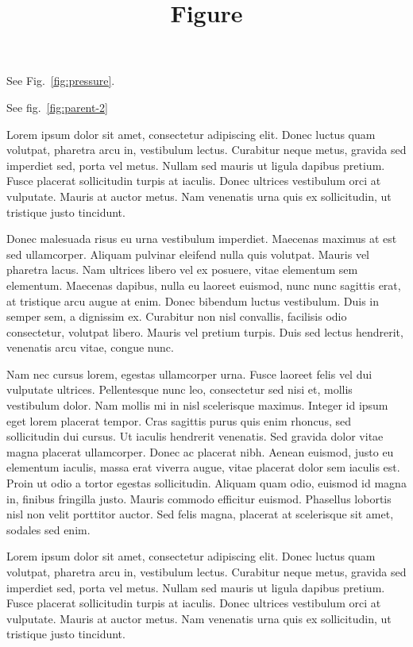 \documentclass[
]{article}
\title{Figure}
\author{}
\date{}
\begin{document}
\maketitle

See Fig.~\ref{fig:pressure}.

See fig.~\ref{fig:parent-2}

Lorem ipsum dolor sit amet, consectetur adipiscing elit. Donec luctus
quam volutpat, pharetra arcu in, vestibulum lectus. Curabitur neque
metus, gravida sed imperdiet sed, porta vel metus. Nullam sed mauris ut
ligula dapibus pretium. Fusce placerat sollicitudin turpis at iaculis.
Donec ultrices vestibulum orci at vulputate. Mauris at auctor metus. Nam
venenatis urna quis ex sollicitudin, ut tristique justo tincidunt.

Donec malesuada risus eu urna vestibulum imperdiet. Maecenas maximus at
est sed ullamcorper. Aliquam pulvinar eleifend nulla quis volutpat.
Mauris vel pharetra lacus. Nam ultrices libero vel ex posuere, vitae
elementum sem elementum. Maecenas dapibus, nulla eu laoreet euismod,
nunc nunc sagittis erat, at tristique arcu augue at enim. Donec bibendum
luctus vestibulum. Duis in semper sem, a dignissim ex. Curabitur non
nisl convallis, facilisis odio consectetur, volutpat libero. Mauris vel
pretium turpis. Duis sed lectus hendrerit, venenatis arcu vitae, congue
nunc.

Nam nec cursus lorem, egestas ullamcorper urna. Fusce laoreet felis vel
dui vulputate ultrices. Pellentesque nunc leo, consectetur sed nisi et,
mollis vestibulum dolor. Nam mollis mi in nisl scelerisque maximus.
Integer id ipsum eget lorem placerat tempor. Cras sagittis purus quis
enim rhoncus, sed sollicitudin dui cursus. Ut iaculis hendrerit
venenatis. Sed gravida dolor vitae magna placerat ullamcorper. Donec ac
placerat nibh. Aenean euismod, justo eu elementum iaculis, massa erat
viverra augue, vitae placerat dolor sem iaculis est. Proin ut odio a
tortor egestas sollicitudin. Aliquam quam odio, euismod id magna in,
finibus fringilla justo. Mauris commodo efficitur euismod. Phasellus
lobortis nisl non velit porttitor auctor. Sed felis magna, placerat at
scelerisque sit amet, sodales sed enim.

Lorem ipsum dolor sit amet, consectetur adipiscing elit. Donec luctus
quam volutpat, pharetra arcu in, vestibulum lectus. Curabitur neque
metus, gravida sed imperdiet sed, porta vel metus. Nullam sed mauris ut
ligula dapibus pretium. Fusce placerat sollicitudin turpis at iaculis.
Donec ultrices vestibulum orci at vulputate. Mauris at auctor metus. Nam
venenatis urna quis ex sollicitudin, ut tristique justo tincidunt.
\end{document}

